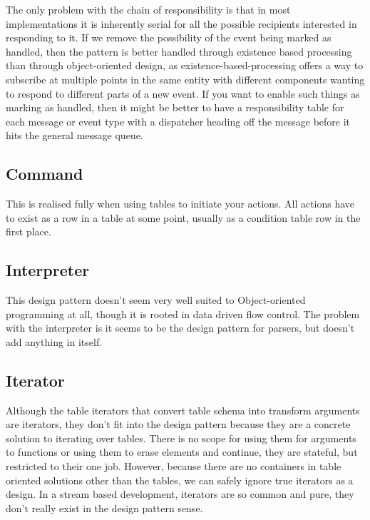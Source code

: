 The only problem with the chain of responsibility is that in most
implementations it is inherently serial for all the possible recipients
interested in responding to it. If we remove the possibility of the event being
marked as handled, then the pattern is better handled through existence based
processing than through object-oriented design, as existence-based-processing
offers a way to subscribe at multiple points in the same entity with different
components wanting to respond to different parts of a new event. If you want to
enable such things as marking as handled, then it might be better to have a
responsibility table for each message or event type with a dispatcher heading
off the message before it hits the general message queue.

\subsection{Command}

This is realised fully when using tables to initiate your actions. All actions
have to exist as a row in a table at some point, usually as a condition table
row in the first place.

\subsection{Interpreter}

This design pattern doesn't seem very well suited to Object-oriented
programming at all, though it is rooted in data driven flow control. The
problem with the interpreter is it seems to be the design pattern for parsers,
but doesn't add anything in itself.

\subsection{Iterator}

Although the table iterators that convert table schema into transform arguments
are iterators, they don't fit into the design pattern because they are a
concrete solution to iterating over tables. There is no scope for using them
for arguments to functions or using them to erase elements and continue, they
are stateful, but restricted to their one job. However, because there are no
containers in table oriented solutions other than the tables, we can safely
ignore true iterators as a design. In a stream based development, iterators are
so common and pure, they don't really exist in the design pattern sense.

